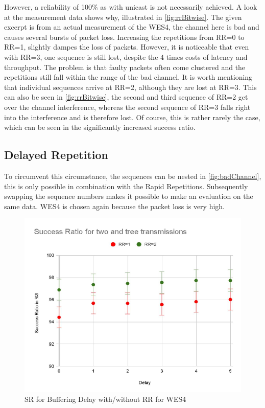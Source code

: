 However, a reliability of 100\% as with unicast is not necessarily achieved.
A look at the measurement data shows why, illustrated in \cref{fig:rrBitwise}.
The given excerpt is from an actual measurement of the WES4, 
the channel here is bad and causes several bursts of packet loss.
Increasing the repetitions from RR=0 to RR=1, slightly dampes the loss of packets.
However, it is noticeable that even with RR=3,
one sequence is still lost, despite the 4 times costs of latency and throughput.
The problem is that faulty packets often come clustered 
and the repetitions still fall within the range of the bad channel.
It is worth mentioning that individual sequences arrive at RR=2, although they are lost at RR=3.
This can also be seen in \cref{fig:rrBitwise}, 
the second and third sequence of RR=2 get over the channel interference,
whereas the second sequence of RR=3 falls right into the interference and is therefore lost.
Of course, this is rather rarely the case, 
which can be seen in the significantly increased success ratio.

\subsection*{Delayed Repetition}

To circumvent this circumstance, the sequences can be nested in \cref{fig:badChannel},
this is only possible in combination with the Rapid Repetitions.
Subsequently swapping the sequence numbers makes it possible to make an evaluation on the same data.
WES4 is chosen again because the packet loss is very high.

\begin{figure}[h]
	\centering
	\includegraphics[scale=0.8]{figures/bufferingDelay.pdf}
	\caption{SR for Buffering Delay with/without RR for WES4}
	\label{fig:bufferingDelay}
\end{figure}

